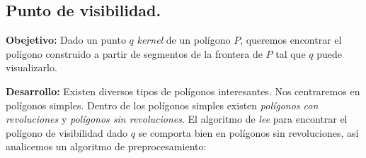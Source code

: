 \subsection[Expositor: Adrián Aguilera.]{Punto de visibilidad.}
\textbf{Obejetivo:} Dado un punto $q$ \textit{kernel} de un polígono $P$,
queremos encontrar el polígono construido a partir de segmentos de la
frontera de $P$ tal que $q$ puede visualizarlo. \newline

\textbf{Desarrollo:} Existen diversos tipos de polígonos interesantes. Nos centraremos
en polígonos simples. Dentro de los polígonos simples existen \textit{polígonos con revoluciones}
y \textit{polígonos sin revoluciones}. El algoritmo de \textit{lee} para encontrar el polígono de
visibilidad dado $q$ se comporta bien en polígonos sin revoluciones, así analicemos un algoritmo de
preprocesamiento:\newline

